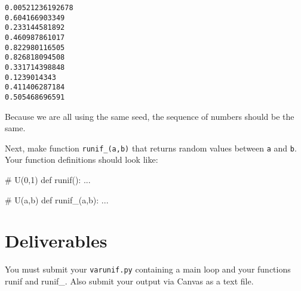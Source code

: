 \begin{fullwidth}
\begin{verbatim}
0.00521236192678
0.604166903349
0.233144581892
0.460987861017
0.822980116505
0.826818094508
0.331714398848
0.1239014343
0.411406287184
0.505468696591
\end{verbatim}

Because we are all using the same seed, the sequence of numbers should be the same.

Next, make function {\tt runif\_(a,b)} that returns random values between {\tt a} and {\tt b}. Your function definitions should look like:

\begin{pyverbatim}
# U(0,1)
def runif():
    ...

# U(a,b)
def runif_(a,b):
    ...
\end{pyverbatim}

\section{Deliverables}

You must submit your {\tt varunif.py} containing a main loop and your functions runif and runif\_. Also submit your output via Canvas as a text file.

\end{fullwidth}
